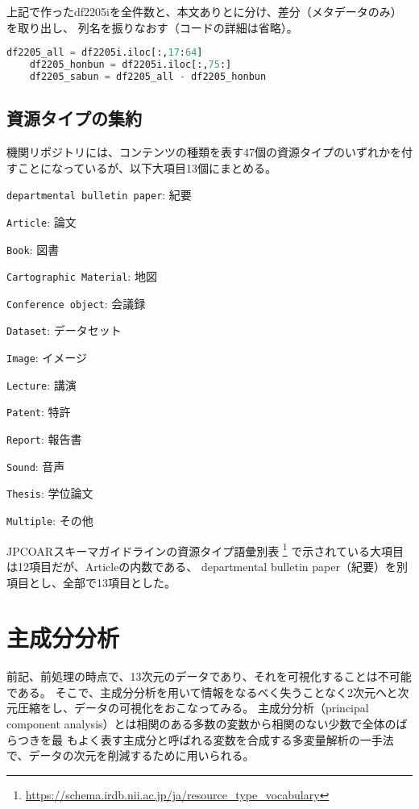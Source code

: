 \documentclass[submit,noauthor]{ono}
\def\|{\verb|}
\begin{document}
上記で作ったdf2205iを全件数と、本文ありとに分け、差分（メタデータのみ）を取り出し、
列名を振りなおす（コードの詳細は省略）。

% Overfull \hbox 対策に、breaklines が必要
\begin{lstlisting}[language=Python,breaklines,caption=hoge,label=fuga]
	df2205_all = df2205i.iloc[:,17:64]
	df2205_honbun = df2205i.iloc[:,75:]
	df2205_sabun = df2205_all - df2205_honbun
	\end{lstlisting}


%2.1
\subsection{資源タイプの集約}
機関リポジトリには、コンテンツの種類を表す47個の資源タイプのいずれかを付すことになっているが、以下大項目13個にまとめる。

\begin{Enumerate}
	\item \|departmental bulletin paper|: 紀要
	\item \|Article|: 論文
	\item \|Book|: 図書
	\item \|Cartographic Material|: 地図
	\item \|Conference object|: 会議録
	\item \|Dataset|: データセット
	\item \|Image|: イメージ
	\item \|Lecture|: 講演
	\item \|Patent|: 特許
	\item \|Report|: 報告書
	\item \|Sound|: 音声
	\item \|Thesis|: 学位論文
	\item \|Multiple|: その他
\end{Enumerate}%

JPCOARスキーマガイドラインの資源タイプ語彙別表
\footnote{\url{https://schema.irdb.nii.ac.jp/ja/resource_type_vocabulary}}
で示されている大項目は12項目だが、Articleの内数である、
departmental bulletin paper（紀要）を別項目とし、全部で13項目とした。


\section{主成分分析}
\label{PCA}
前記、前処理の時点で、13次元のデータであり、それを可視化することは不可能である。
そこで、主成分分析を用いて情報をなるべく失うことなく2次元へと次元圧縮をし、データの可視化をおこなってみる。
主成分分析（principal component analysis）とは相関のある多数の変数から相関のない少数で全体のばらつきを最
もよく表す主成分と呼ばれる変数を合成する多変量解析の一手法で、データの次元を削減するために用いられる。
\end{document}
